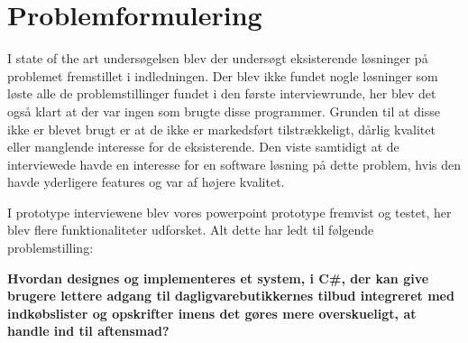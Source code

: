 \section{Problemformulering}\label{section:problemformulering}

%
%
%

I state of the art undersøgelsen blev der undersøgt eksisterende løsninger på problemet fremstillet i indledningen. 
Der blev ikke fundet nogle løsninger som løste alle de problemstillinger fundet i den første interviewrunde, her blev det også klart at der var ingen som brugte disse programmer.
Grunden til at disse ikke er blevet brugt er at de ikke er markedsført tilstrækkeligt, dårlig kvalitet eller manglende interesse for de eksisterende. 
Den viste samtidigt at de interviewede havde en interesse for en software løsning på dette problem, hvis den havde yderligere features og var af højere kvalitet. 

I prototype interviewene blev vores powerpoint prototype fremvist og testet, her blev flere funktionaliteter udforsket. 
Alt dette har ledt til følgende problemstilling:

\textbf{Hvordan designes og implementeres et system, i C\#, der kan give brugere lettere adgang til dagligvarebutikkernes tilbud integreret med indkøbslister og opskrifter imens det gøres mere overskueligt, at handle ind til aftensmad? }
